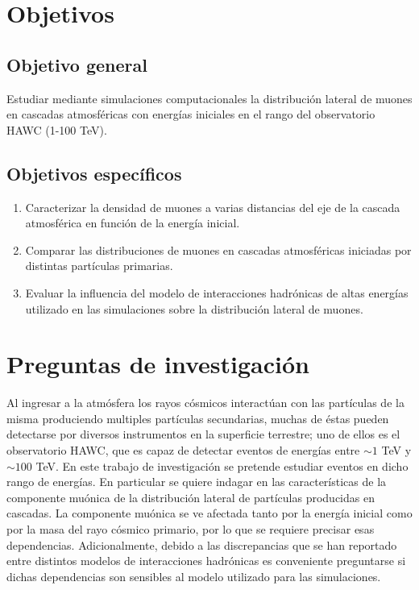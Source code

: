 \section{Objetivos}
	\subsection*{Objetivo general}
	Estudiar mediante simulaciones computacionales la distribución lateral de muones en cascadas atmosféricas con energías iniciales en el rango del observatorio HAWC (1-100 TeV).

	\subsection*{Objetivos específicos}	
	\begin{enumerate}
	\item Caracterizar la densidad de muones a varias distancias del eje de la cascada atmosf\'erica en funci\'on de la energ\'ia inicial.
	\item Comparar las distribuciones de muones en cascadas atmosf\'ericas iniciadas por distintas part\'iculas primarias.
	\item Evaluar la influencia del modelo de interacciones hadr\'onicas de altas energ\'ias utilizado en las simulaciones sobre la distribuci\'on lateral de muones.
	\end{enumerate}

\section{Preguntas de investigación}
Al ingresar a la atm\'osfera los rayos c\'osmicos interact\'uan con las part\'iculas de la misma produciendo multiples part\'iculas secundarias, muchas de \'estas pueden detectarse por diversos instrumentos en la superficie terrestre; uno de ellos es el observatorio HAWC, que es capaz de detectar eventos de energ\'ias entre $\sim 1$ TeV y $\sim 100$ TeV. En este trabajo de investigaci\'on se pretende estudiar eventos en dicho rango de energ\'ias. En particular se quiere indagar en las caracter\'isticas de la componente mu\'onica de la distribuci\'on lateral de part\'iculas producidas en cascadas. La componente mu\'onica se ve afectada tanto por la energ\'ia inicial como por la masa del rayo c\'osmico primario, por lo que se requiere precisar esas dependencias. Adicionalmente, debido a las discrepancias que se han reportado entre distintos modelos de interacciones hadr\'onicas es conveniente preguntarse si dichas dependencias son sensibles al modelo utilizado para las simulaciones.

